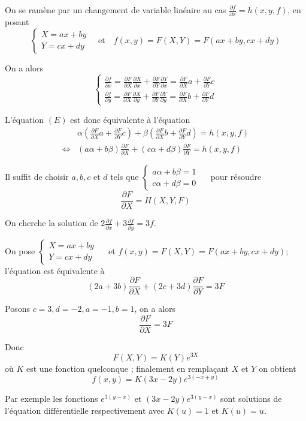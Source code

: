\documentclass[12pt]{article}
\newcounter{exemple}
\newcounter{exercice}
\begin{document}
On se ramène par un changement de variable linéaire au cas $\frac{\partial f}{\partial x} = h(x, y, f)$, en posant
$$
\left\{\begin{array}{l}
X = ax + by \\
Y = cx + dy
\end{array} \quad \text{et} \quad f(x, y) = F(X, Y) = F(ax+by, cx+dy)\right.
$$

On a alors
$$
\left\{\begin{array}{l}
\frac{\partial f}{\partial x} = \frac{\partial F}{\partial X} \frac{\partial X}{\partial x} + \frac{\partial F}{\partial Y} \frac{\partial Y}{\partial x} = \frac{\partial F}{\partial X} a + \frac{\partial F}{\partial Y} c \\
\frac{\partial f}{\partial y} = \frac{\partial F}{\partial X} \frac{\partial X}{\partial y} + \frac{\partial F}{\partial Y} \frac{\partial Y}{\partial y} = \frac{\partial F}{\partial X} b + \frac{\partial F}{\partial Y} d
\end{array}\right.
$$

L'équation $(E)$ est donc équivalente à l'équation
$$
\begin{array}{ll} 
& \alpha\left(\frac{\partial F}{\partial X} a + \frac{\partial F}{\partial Y} c\right) + \beta\left(\frac{\partial F}{\partial X} b + \frac{\partial F}{\partial Y} d\right) = h(x, y, f) \\
\Longleftrightarrow & (a \alpha + b \beta) \frac{\partial F}{\partial X} + (c \alpha + d \beta) \frac{\partial F}{\partial Y} = h(x, y, f)
\end{array}
$$

Il suffit de choisir $a, b, c$ et $d$ tels que $\left\{\begin{array}{l}a \alpha + b \beta = 1 \\ c \alpha + d \beta = 0\end{array} \quad\right.$ pour résoudre
$$
\frac{\partial F}{\partial X} = H(X, Y, F)
$$

\begin{exercice}
On cherche la solution de $2 \frac{\partial f}{\partial x} + 3 \frac{\partial f}{\partial y} = 3f$.
\end{exercice}

\begin{corrige}
On pose $\left\{\begin{array}{l}X = ax + by \\ Y = cx + dy\end{array} \quad\right.$ et $f(x, y) = F(X, Y) = F(ax+by, cx+dy)$; l'équation est équivalente à
$$
(2a+3b) \frac{\partial F}{\partial X} + (2c+3d) \frac{\partial F}{\partial Y} = 3F
$$

Posons $c=3, d=-2, a=-1, b=1$, on a alors
$$
\frac{\partial F}{\partial X} = 3F
$$

Donc
$$
F(X, Y) = K(Y) e^{3X}
$$
où $K$ est une fonction quelconque ; finalement en remplaçant $X$ et $Y$ on obtient
$$
f(x, y) = K(3x-2y) e^{3(-x+y)}
$$

Par exemple les fonctions $e^{3(y-x)}$ et $(3x-2y) e^{3(y-x)}$ sont solutions de l'équation différentielle respectivement avec $K(u)=1$ et $K(u)=u$.
\end{corrige}
\end{document}
